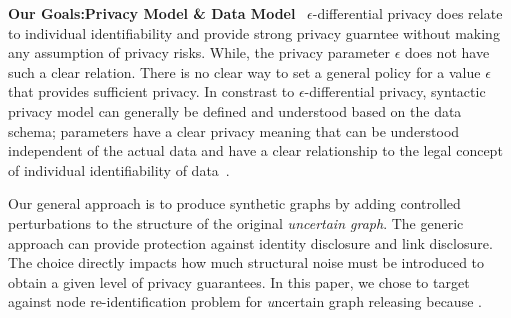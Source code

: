 \textbf{Our Goals:Privacy Model \& Data Model}~
$\epsilon$-differential privacy does relate to individual identifiability and provide strong privacy guarntee without making any assumption of privacy risks. While, the privacy parameter $\epsilon$ does not have such a clear relation. There is no clear way to set a general policy for a value $\epsilon$ that provides sufficient privacy. In constrast to $\epsilon$-differential privacy, syntactic privacy model can generally be defined and understood based on the data schema; parameters have a clear privacy meaning that can be understood independent of the actual data and have a clear relationship to the legal concept of individual identifiability of data~\cite{}.  

Our general approach is to produce synthetic graphs by adding controlled perturbations to the structure of the original \emph{uncertain graph}. The generic approach can provide protection against identity disclosure and link disclosure. The choice directly impacts how much structural noise must be introduced to obtain a given level of privacy guarantees. In this paper, we chose to target against node re-identification problem for {\emph uncertain graph} releasing because . 